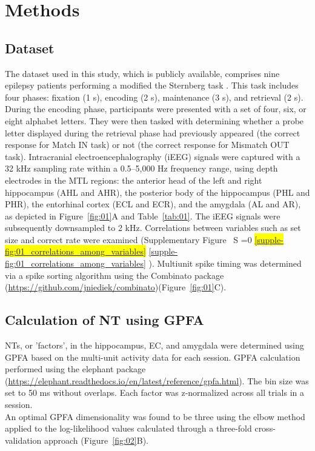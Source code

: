 \documentclass[preprint,review,12pt]{elsarticle}%
\newcommand{\hl}[1]{\colorbox{yellow}{#1}}
\newcommand{\hlref}[1]{%
  \ifnum\getrefnumber{#1}=0
    \hl{\ref*{#1}}%
  \else
    \ref{#1}%
  \fi
}
\newcommand*\sref[1]{%
    S\hlref{#1}}
\begin{document}
\section{Methods}

\subsection{Dataset}
The dataset used in this study, which is publicly available, comprises nine epilepsy patients performing a modified the Sternberg task \cite{boran_dataset_2020}. This task includes four phases: fixation (1 s), encoding (2 s), maintenance (3 s), and retrieval (2 s). During the encoding phase, participants were presented with a set of four, six, or eight alphabet letters. They were then tasked with determining whether a probe letter displayed during the retrieval phase had previously appeared (the correct response for Match IN task) or not (the correct response for Mismatch OUT task). Intracranial electroencephalography (iEEG) signals were captured with a 32 kHz sampling rate within a 0.5--5,000 Hz frequency range, using depth electrodes in the MTL regions: the anterior head of the left and right hippocampus (AHL and AHR), the posterior body of the hippocampus (PHL and PHR), the entorhinal cortex (ECL and ECR), and the amygdala (AL and AR), as depicted in Figure~\ref{fig:01}A and Table~\ref{tab:01}. The iEEG signals were subsequently downsampled to 2 kHz. Correlations between variables such as set size and correct rate were examined (Supplementary Figure~\sref{supple-fig:01_correlations_among_variables}). Multiunit spike timing was determined via a spike sorting algorithm \cite{niediek_reliable_2016} using the Combinato package (\url{https://github.com/jniediek/combinato})(Figure~\ref{fig:01}C).

\subsection{Calculation of NT using GPFA}
NTs, or 'factors', in the hippocampus, EC, and amygdala were determined using GPFA \cite{yu_gaussian-process_2009} based on the multi-unit activity data for each session. GPFA calculation performed using the elephant package (\url{https://elephant.readthedocs.io/en/latest/reference/gpfa.html}). The bin size was set to 50 ms without overlaps. Each factor was z-normalized across all trials in a session.
\\
\indent
An optimal GPFA dimensionality was found to be three using the elbow method applied to the log-likelihood values calculated through a three-fold cross-validation approach (Figure~\ref{fig:02}B).
\end{document}
